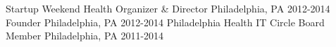 \begin{cvhonors}
  \cvhonor
    {Startup Weekend Health}
    {Organizer \& Director}
    {Philadelphia, PA}
    {2012-2014}
  {Founder}
  {Philadelphia, PA}
  {2012-2014}
  \cvhonor
    {Philadelphia Health IT Circle}
    {Board Member}
    {Philadelphia, PA}
    {2011-2014}
    \cvhonor
\end{cvhonors}
